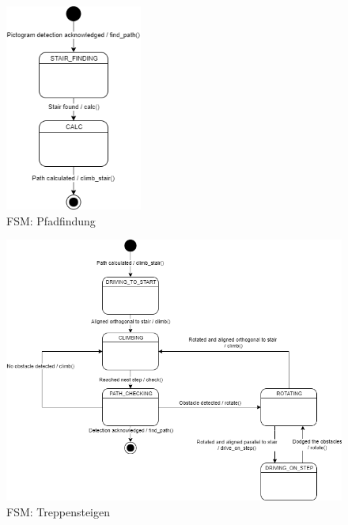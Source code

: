 \begin{figure}[H]
  \includegraphics[width=0.40\textwidth]{img/softwarearchitektur/FSM-PATH_FINDING.png}
  \centering
  \caption{FSM: Pfadfindung}
  \label{fig:fsm-pathfinding}
\end{figure}

\begin{figure}[H]
  \includegraphics[width=1\textwidth]{img/softwarearchitektur/FSM-STAIR_CLIMBING.png}
  \centering
  \caption{FSM: Treppensteigen}
  \label{fig:fsm-stair-climbing}
\end{figure}

